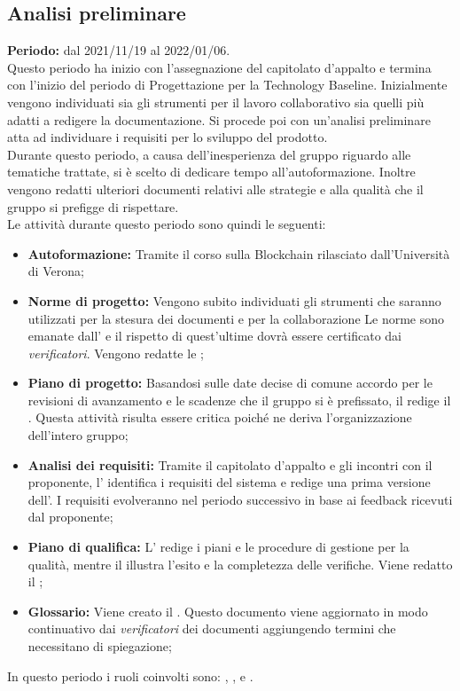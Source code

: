 \subsection{Analisi preliminare} \label{subsection:pianificazione_Analisi}
\textbf{Periodo:} dal 2021/11/19 al 2022/01/06.
\bigskip
\\Questo periodo ha inizio con l'assegnazione del capitolato d'appalto e termina con l'inizio del periodo di Progettazione per la Technology Baseline\glo{}.
Inizialmente vengono individuati sia gli strumenti per il lavoro collaborativo sia quelli più adatti a redigere la documentazione.
Si procede poi con un'analisi preliminare atta ad individuare i requisiti per lo sviluppo del prodotto.
\\Durante questo periodo, a causa dell'inesperienza del gruppo riguardo alle tematiche trattate, si è scelto di dedicare tempo all'autoformazione.
Inoltre vengono redatti ulteriori documenti relativi alle strategie e alla qualità che il gruppo \groupName{} si prefigge di rispettare.
\\Le attività durante questo periodo sono quindi le seguenti:
\begin{itemize}
  \item \textbf{Autoformazione:} Tramite il corso sulla Blockchain\glo{} rilasciato dall'Università di Verona;
  \item \textbf{Norme di progetto:} Vengono subito individuati gli strumenti che saranno utilizzati per la stesura dei documenti e per la collaborazione
  Le norme sono emanate dall'\roleAdministratorLow{} e il rispetto di quest'ultime dovrà essere certificato dai \textit{verificatori}. Vengono redatte le \docNameNdP{};
  \item \textbf{Piano di progetto:} Basandosi sulle date decise di comune accordo per le revisioni di avanzamento e le scadenze che il gruppo si è prefissato, il \roleProjectManager{} redige il \docNamePdP{}.
  Questa attività risulta essere critica poiché ne deriva l'organizzazione dell'intero gruppo;
  \item \textbf{Analisi dei requisiti:} Tramite il capitolato d'appalto e gli incontri con il proponente, l'\roleAnalystLow{} identifica i requisiti del sistema e redige una prima versione dell'\docNameAdR{}.
  I requisiti evolveranno nel periodo successivo in base ai feedback ricevuti dal proponente;
  \item \textbf{Piano di qualifica:} L'\roleAdministratorLow{} redige i piani e le procedure di gestione per la qualità, mentre il \roleVerifierLow{} illustra l'esito e la completezza delle verifiche. Viene redatto il \docNamePdQ{};
  \item \textbf{Glossario:} Viene creato il \docNameGlo{}. Questo documento viene aggiornato in modo continuativo dai \textit{verificatori} dei documenti aggiungendo termini che necessitano di spiegazione;
\end{itemize}
In questo periodo i ruoli coinvolti sono: \roleProjectManagerLow{}, \roleAdministratorLow{}, \roleAnalystLow{} e \roleVerifierLow{}.


